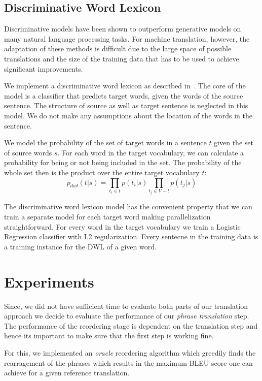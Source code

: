 \documentclass[11pt]{article}
\numberwithin{equation}{section}
\begin{document}
\subsection{Discriminative Word Lexicon}
\label{sec:dwl}

Discriminative models have been shown to outperform generative models on many natural language processing tasks. For machine 
translation, however, the adaptation of these methods is difﬁcult due to the large space of possible translations and the size of the 
training data that has to be used to achieve signiﬁcant improvements. 

We implement a discriminative word lexicon as described in~\cite{Mauser:2009:ESM:1699510.1699538}.
The core of the model is a classiﬁer that predicts target words, given the words of the source
sentence. The structure of source as well as target sentence is neglected in this model. We do
not make any assumptions about the location of the words in the sentence.

We model the probability of the set of target
words in a sentence $t$ given the set of source words
$s$. For each word in the target vocabulary, we can
calculate a probability for being or not being included in the set. The probability of the whole set
then is the product over the entire target vocabulary $t$:
\[
p_{dwl}(t|s) = \prod_{t_i \in t} p(t_i|s) \prod_{t_j \in V-t} p(t_j|s)
\]

The discriminative word lexicon model has the
convenient property that we can train a separate
model for each target word making parallelization straightforward.
For every word in the target vocabulary we train a Logistic Regression classifier with L2 regularization.
Every sentecne in the training data is a training instance for the DWL of a given word.

\section{Experiments}
\label{sec:experiments}

Since, we did not have sufficient time to evaluate both parts of our translation approach we decide to evaluate
the performance of our \textit{phrase translation} step. The performance of the reordering stage is dependent
on the translation step and hence its important to make sure that the first step is working fine.

For this, we implemented an \textit{oracle} reordering algorithm which greedily finds the rearragement of the phrases
which results in the maximum BLEU score one can achieve for a given reference translation.
\end{document}
